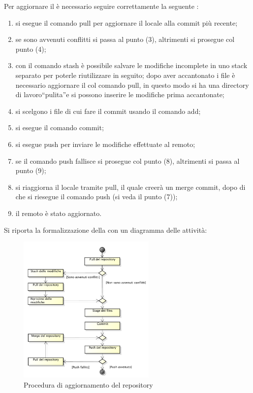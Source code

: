 					Per aggiornare il  è necessario seguire correttamente la seguente :
					\begin{enumerate}
						\item si esegue il comando  pull per aggiornare il  locale alla commit più recente;
						\item se sono avvenuti conflitti si passa al punto (3), altrimenti si prosegue col punto (4);
						\item con il comando  stash è possibile salvare le modifiche incomplete in uno stack separato per poterle riutilizzare in seguito; dopo aver accantonato i file è necessario aggiornare il  col comando  pull, in questo modo si ha una directory di lavoro“pulita”e si possono inserire le modifiche prima accantonate;
						\item si scelgono i file di cui fare il commit usando il comando  add;
						\item si esegue il comando  commit;
						\item si esegue  push per inviare le modifiche effettuate al  remoto;
						\item se il comando push fallisce si prosegue col punto (8), altrimenti si passa al punto (9);
						\item si riaggiorna il  locale tramite  pull, il quale creerà un merge commit, dopo di che si riesegue il comando push (si veda il punto (7));
						\item il  remoto è stato aggiornato.
					\end{enumerate}
					Si riporta la formalizzazione della  con un diagramma delle attività:
					\begin{figure}[H]
						\centering
						\includegraphics[width=0.6\textwidth]{NormeDiProgetto/Pics/Commit}
						\caption{Procedura di aggiornamento del repository}
					\end{figure}


